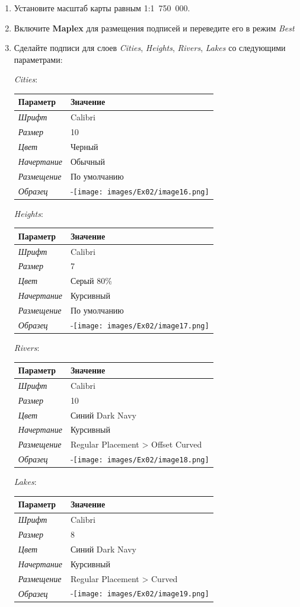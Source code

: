 \documentclass[12pt,]{book}
\begin{document}
\begin{enumerate}
\def\labelenumi{\arabic{enumi}.}
\item
  Установите масштаб карты равным 1:1~750~000.
\item
  Включите \textbf{Maplex} для размещения подписей и переведите его в режим \emph{Best}
\item
  Сделайте подписи для слоев \emph{Cities}, \emph{Heights}, \emph{Rivers}, \emph{Lakes} со следующими параметрами:

  \emph{Cities}:

  \begin{longtable}[]{@{}ll@{}}
  \toprule
  Параметр & Значение\tabularnewline
  \midrule
  \endhead
  \emph{Шрифт} & Calibri\tabularnewline
  \emph{Размер} & 10\tabularnewline
  \emph{Цвет} & Черный\tabularnewline
  \emph{Начертание} & Обычный\tabularnewline
  \emph{Размещение} & По умолчанию\tabularnewline
  \emph{Образец} & -\texttt{[image: images/Ex02/image16.png]}\tabularnewline
  \bottomrule
  \end{longtable}

  \emph{Heights}:

  \begin{longtable}[]{@{}ll@{}}
  \toprule
  Параметр & Значение\tabularnewline
  \midrule
  \endhead
  \emph{Шрифт} & Calibri\tabularnewline
  \emph{Размер} & 7\tabularnewline
  \emph{Цвет} & Серый 80\%\tabularnewline
  \emph{Начертание} & Курсивный\tabularnewline
  \emph{Размещение} & По умолчанию\tabularnewline
  \emph{Образец} & -\texttt{[image: images/Ex02/image17.png]}\tabularnewline
  \bottomrule
  \end{longtable}

  \emph{Rivers}:

  \begin{longtable}[]{@{}ll@{}}
  \toprule
  Параметр & Значение\tabularnewline
  \midrule
  \endhead
  \emph{Шрифт} & Calibri\tabularnewline
  \emph{Размер} & 10\tabularnewline
  \emph{Цвет} & Синий Dark Navy\tabularnewline
  \emph{Начертание} & Курсивный\tabularnewline
  \emph{Размещение} & Regular Placement \textgreater{} Offset Curved\tabularnewline
  \emph{Образец} & -\texttt{[image: images/Ex02/image18.png]}\tabularnewline
  \bottomrule
  \end{longtable}

  \emph{Lakes}:

  \begin{longtable}[]{@{}ll@{}}
  \toprule
  Параметр & Значение\tabularnewline
  \midrule
  \endhead
  \emph{Шрифт} & Calibri\tabularnewline
  \emph{Размер} & 8\tabularnewline
  \emph{Цвет} & Синий Dark Navy\tabularnewline
  \emph{Начертание} & Курсивный\tabularnewline
  \emph{Размещение} & Regular Placement \textgreater{} Curved\tabularnewline
  \emph{Образец} & -\texttt{[image: images/Ex02/image19.png]}\tabularnewline
  \bottomrule
  \end{longtable}
\end{enumerate}
\end{document}
